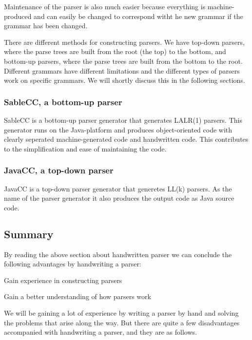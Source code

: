 Maintenance of the parser is also much easier because everything is
machine-produced and can easily be changed to correspond witht he new grammar if
the grammar has been changed.

There are different methods for constructing parsers. We have top-down parsers,
where the parse trees are built from the root (the top) to the bottom, and
bottom-up parsers, where the parse trees are built from the bottom to the root.
Different grammars have different limitations and  the different types of
parsers work on specific grammars. We will shortly discuss this in the following
sections.

\subsubsection{SableCC, a bottom-up parser}
\label{subsec:sablecc}
SableCC is a bottom-up parser generator that generates LALR(1) parsers. This
generator runs on the Java-platform and produces object-oriented code with
clearly seperated machine-generated code and handwritten code. This contributes
to the simplification and ease of maintaining the code.\cite[pp. 11]{sableccdoc}

\subsubsection{JavaCC, a top-down parser}
\label{subsec:javacc}
JavaCC is a top-down parser generator that generetes LL(k) parsers. As the name
of the parser generator it also produces the output code as Java source
code.\cite{wiki-javacc}

\subsection{Summary}
\label{subsec:summary-parser}
By reading the above section about handwritten parser we can conclude the
following advantages by handwriting a parser:

\begin{dlist}
\item Gain experience in constructing parsers
\item Gain a better understanding of how parsers work
\end{dlist}

We will be gaining a lot of experience by writing a parser by hand and solving
the problems that arise along the way. But there are quite a few disadvantages
accompanied with handwriting a parser, and they are as follows.

